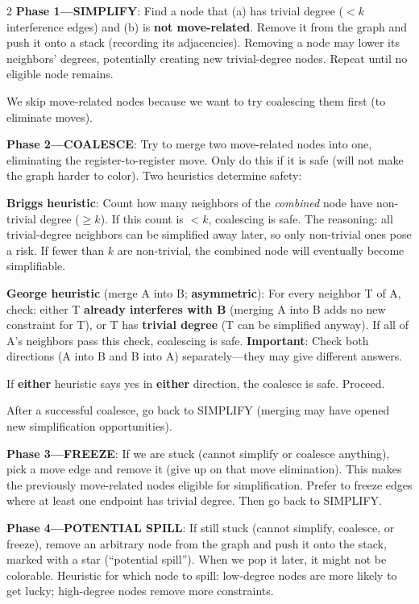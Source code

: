 \documentclass[9pt,landscape]{extarticle}
\begin{document}
\begin{multicols}{2}
\textbf{Phase 1---SIMPLIFY}: Find a node that (a) has trivial degree ($< k$ interference edges) and (b) is \textbf{not move-related}. Remove it from the graph and push it onto a stack (recording its adjacencies). Removing a node may lower its neighbors' degrees, potentially creating new trivial-degree nodes. Repeat until no eligible node remains.

We skip move-related nodes because we want to try coalescing them first (to eliminate moves).

\textbf{Phase 2---COALESCE}: Try to merge two move-related nodes into one, eliminating the register-to-register move. Only do this if it is safe (will not make the graph harder to color). Two heuristics determine safety:

\begin{keybox}
\textbf{Briggs heuristic}: Count how many neighbors of the \emph{combined} node have non-trivial degree ($\geq k$). If this count is $< k$, coalescing is safe. The reasoning: all trivial-degree neighbors can be simplified away later, so only non-trivial ones pose a risk. If fewer than $k$ are non-trivial, the combined node will eventually become simplifiable.

\textbf{George heuristic} (merge A into B; \textbf{asymmetric}): For every neighbor T of A, check: either T \textbf{already interferes with B} (merging A into B adds no new constraint for T), or T has \textbf{trivial degree} (T can be simplified anyway). If all of A's neighbors pass this check, coalescing is safe. \textbf{Important}: Check both directions (A into B and B into A) separately---they may give different answers.

If \textbf{either} heuristic says yes in \textbf{either} direction, the coalesce is safe. Proceed.
\end{keybox}

After a successful coalesce, go back to SIMPLIFY (merging may have opened new simplification opportunities).

\textbf{Phase 3---FREEZE}: If we are stuck (cannot simplify or coalesce anything), pick a move edge and remove it (give up on that move elimination). This makes the previously move-related nodes eligible for simplification. Prefer to freeze edges where at least one endpoint has trivial degree. Then go back to SIMPLIFY.

\textbf{Phase 4---POTENTIAL SPILL}: If still stuck (cannot simplify, coalesce, or freeze), remove an arbitrary node from the graph and push it onto the stack, marked with a star (``potential spill''). When we pop it later, it might not be colorable. Heuristic for which node to spill: low-degree nodes are more likely to get lucky; high-degree nodes remove more constraints.


\end{multicols}
\end{document}
